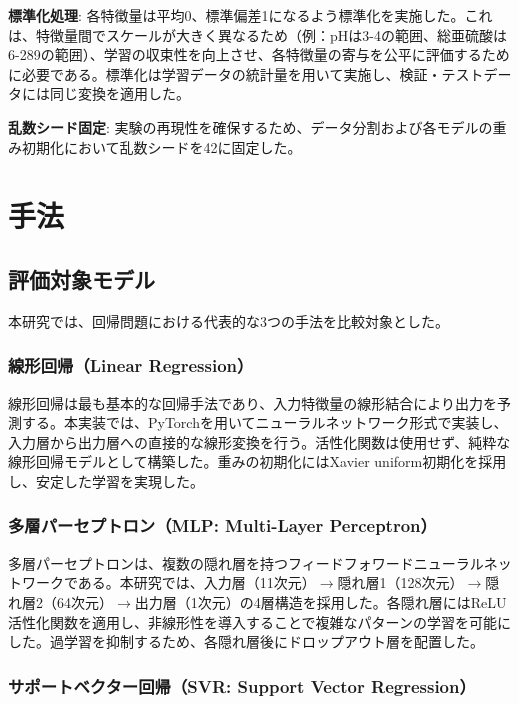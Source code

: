 \documentclass[12pt,a4paper,dvipdfmx]{jsarticle}
\begin{document}
\textbf{標準化処理}: 各特徴量は平均0、標準偏差1になるよう標準化を実施した。これは、特徴量間でスケールが大きく異なるため（例：pHは3-4の範囲、総亜硫酸は6-289の範囲）、学習の収束性を向上させ、各特徴量の寄与を公平に評価するために必要である。標準化は学習データの統計量を用いて実施し、検証・テストデータには同じ変換を適用した。

\textbf{乱数シード固定}: 実験の再現性を確保するため、データ分割および各モデルの重み初期化において乱数シードを42に固定した。

\section{手法}

\subsection{評価対象モデル}

本研究では、回帰問題における代表的な3つの手法を比較対象とした。

\subsubsection{線形回帰（Linear Regression）}

線形回帰は最も基本的な回帰手法であり、入力特徴量の線形結合により出力を予測する。本実装では、PyTorchを用いてニューラルネットワーク形式で実装し、入力層から出力層への直接的な線形変換を行う。活性化関数は使用せず、純粋な線形回帰モデルとして構築した。重みの初期化にはXavier uniform初期化を採用し、安定した学習を実現した。

\subsubsection{多層パーセプトロン（MLP: Multi-Layer Perceptron）}

多層パーセプトロンは、複数の隠れ層を持つフィードフォワードニューラルネットワークである。本研究では、入力層（11次元）$\rightarrow$隠れ層1（128次元）$\rightarrow$隠れ層2（64次元）$\rightarrow$出力層（1次元）の4層構造を採用した。各隠れ層にはReLU活性化関数を適用し、非線形性を導入することで複雑なパターンの学習を可能にした。過学習を抑制するため、各隠れ層後にドロップアウト層を配置した。

\subsubsection{サポートベクター回帰（SVR: Support Vector Regression）}
\end{document}
